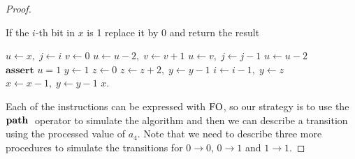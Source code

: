 \begin{proof}
	\begin{algorithm} \label{switch1to0}
	\caption{If the $i$-th bit in $x$ is 1 replace it by 0 and return the result}
	\begin{algorithmic}
		\State $u \gets x,\; j \gets i$ 
		\State $v \gets 0$
		\State $u \gets u-2,\; v \gets v+1$
		\EndWhile
		\State $u\gets v,\; j \gets j-1$
		\EndWhile
		\State $u \gets u-2$
		\EndWhile
		\State $\textbf{assert } u = 1$ 	
		\State $y \gets 1$ 
		\State $z \gets 0$
		\State $z \gets z+2,\; y \gets y-1$
		\EndWhile
		\State $i \gets i-1,\; y \gets z$
		\EndWhile
		 
		\State $x \gets x-1,\; y \gets y-1$
		\EndWhile
		\State \Return $x$.
	\end{algorithmic}
	\end{algorithm}	
	Each of the instructions can be expressed with ${\rm FO}$, so our strategy is to use the ${\bf path} \;$ operator to simulate the algorithm and then we can describe a transition using the processed value of $a_4$. Note that we need to describe three more procedures to simulate the transitions for $0\to 0$, $0 \to 1$ and $1\to 1$.
	

\end{proof}
